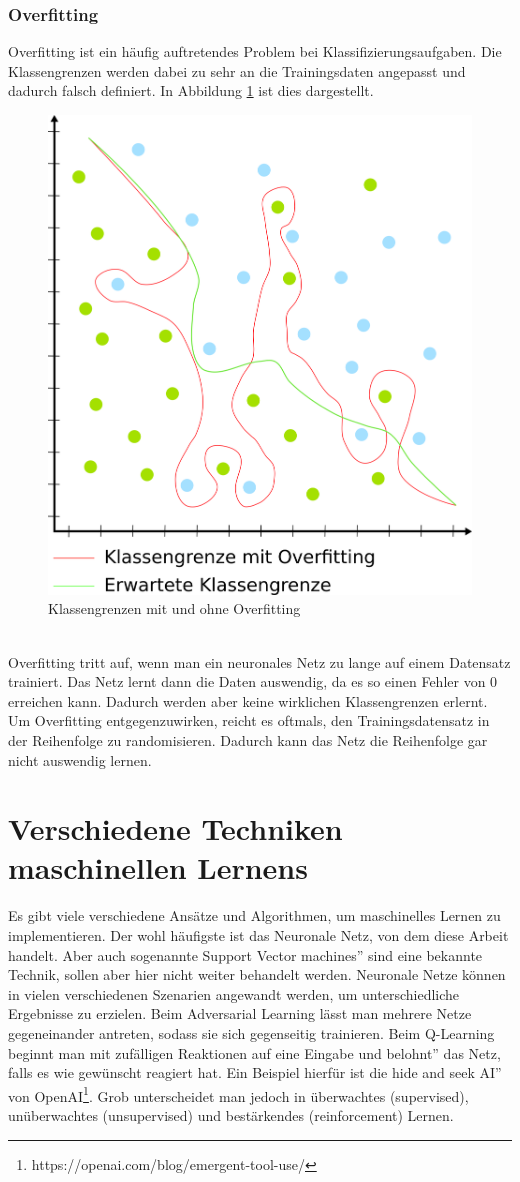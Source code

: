 \documentclass[11pt]{article}
\begin{document}
\subsubsection{Overfitting}
Overfitting ist ein häufig auftretendes Problem bei Klassifizierungsaufgaben. Die Klassengrenzen werden dabei zu sehr an die Trainingsdaten angepasst und dadurch falsch definiert. In Abbildung \ref{Overfitting} ist dies dargestellt.
\begin{figure}[h]
	\centering
	\includegraphics[width=0.6\linewidth]{../graphics/overfitting.png}
	\caption{Klassengrenzen mit und ohne Overfitting}
	\label{Overfitting}
\end{figure}
\\
Overfitting tritt auf, wenn man ein neuronales Netz zu lange auf einem Datensatz trainiert. Das Netz lernt dann die Daten auswendig, da es so einen Fehler von 0 erreichen kann. Dadurch werden aber keine wirklichen Klassengrenzen erlernt.\\
Um Overfitting entgegenzuwirken, reicht es oftmals, den Trainingsdatensatz in der Reihenfolge zu randomisieren. Dadurch kann das Netz die Reihenfolge gar nicht auswendig lernen.

\section{Verschiedene Techniken maschinellen Lernens}\label{sec:verschiedene-techniken-maschinellen-lernens}
Es gibt viele verschiedene Ansätze und Algorithmen, um maschinelles Lernen zu implementieren. Der wohl häufigste ist das Neuronale Netz, von dem diese Arbeit handelt. Aber auch sogenannte \glqq Support Vector machines'' sind eine bekannte Technik, sollen aber hier nicht weiter behandelt werden. Neuronale Netze können in vielen verschiedenen Szenarien angewandt werden, um unterschiedliche Ergebnisse zu erzielen. Beim Adversarial Learning lässt man mehrere Netze gegeneinander antreten, sodass sie sich gegenseitig trainieren. Beim Q-Learning beginnt man mit zufälligen Reaktionen auf eine Eingabe und \glqq belohnt'' das Netz, falls es wie gewünscht reagiert hat. Ein Beispiel hierfür ist die \glqq hide and seek AI'' von OpenAI\footnote{https://openai.com/blog/emergent-tool-use/}. Grob unterscheidet man jedoch in überwachtes (supervised), unüberwachtes (unsupervised) und bestärkendes (reinforcement) Lernen.
\end{document}

